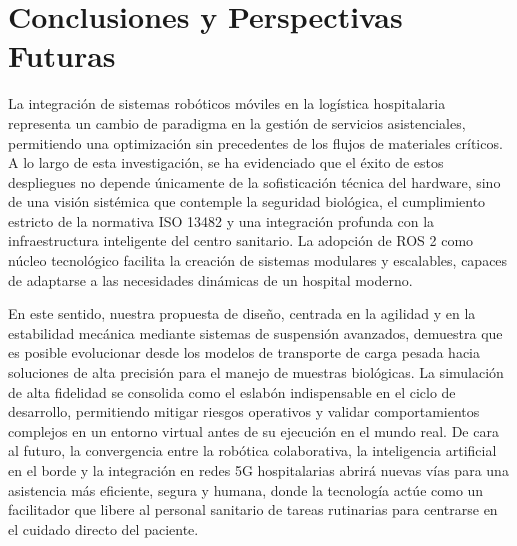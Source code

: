 \section{Conclusiones y Perspectivas Futuras}
La integración de sistemas robóticos móviles en la logística hospitalaria representa un cambio de paradigma en la gestión de servicios asistenciales, permitiendo una optimización sin precedentes de los flujos de materiales críticos. A lo largo de esta investigación, se ha evidenciado que el éxito de estos despliegues no depende únicamente de la sofisticación técnica del hardware, sino de una visión sistémica que contemple la seguridad biológica, el cumplimiento estricto de la normativa ISO 13482 y una integración profunda con la infraestructura inteligente del centro sanitario. La adopción de ROS 2 como núcleo tecnológico facilita la creación de sistemas modulares y escalables, capaces de adaptarse a las necesidades dinámicas de un hospital moderno.

En este sentido, nuestra propuesta de diseño, centrada en la agilidad y en la estabilidad mecánica mediante sistemas de suspensión avanzados, demuestra que es posible evolucionar desde los modelos de transporte de carga pesada hacia soluciones de alta precisión para el manejo de muestras biológicas. La simulación de alta fidelidad se consolida como el eslabón indispensable en el ciclo de desarrollo, permitiendo mitigar riesgos operativos y validar comportamientos complejos en un entorno virtual antes de su ejecución en el mundo real. De cara al futuro, la convergencia entre la robótica colaborativa, la inteligencia artificial en el borde y la integración en redes 5G hospitalarias abrirá nuevas vías para una asistencia más eficiente, segura y humana, donde la tecnología actúe como un facilitador que libere al personal sanitario de tareas rutinarias para centrarse en el cuidado directo del paciente.
